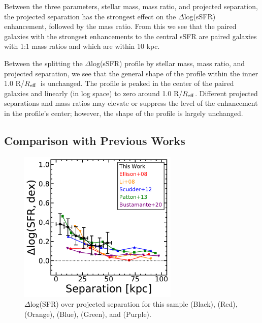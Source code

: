 \documentclass[iop,revtex4,twocolumn,apj,numberedappendix,appendixfloats]{emulateapj}
\newcommand{\reff}{$R_{\rm eff}$}
\begin{document}
Between the three parameters, stellar mass, mass ratio, and projected separation, the projected separation has the strongest effect on the $\Delta$log(sSFR) enhancement, followed by the mass ratio. From this we see that the paired galaxies with the strongest enhancements to the central sSFR are paired galaxies with 1:1 mass ratios and  which are within 10 kpc. 

Between the splitting the $\Delta$log(sSFR) profile by stellar mass, mass ratio, and projected separation, we see that the general shape of the profile within the inner 1.0 R/\reff\ is unchanged. The profile is peaked in the center of the paired galaxies and linearly (in log space) to zero around 1.0 R/\reff. Different projected separations and mass ratios may elevate or suppress the level of the enhancement in the profile's center; however, the shape of the profile is largely unchanged.

\subsection{Comparison with Previous Works}

\begin{figure}
\centering
\includegraphics[width=3in]{fig/nuc_sep.pdf}
\caption[]{$\Delta$log(SFR) over projected separation for this sample (Black), \citet{Ellison:2008} (Red), \citet{Li:2008} (Orange), \citet{Scudder:2012} (Blue), \citet{Patton:2013} (Green), and \citet{Bustamante:2020} (Purple).  }
\label{fig:nuc_sep}
\end{figure}
\end{document}
